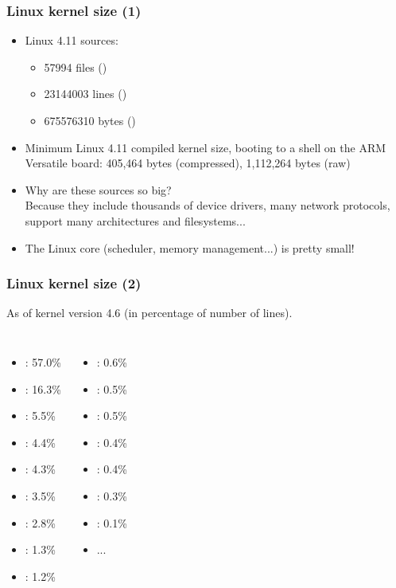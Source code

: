 \begin{frame}
  \frametitle{Linux kernel size (1)}
  \begin{itemize}
  \item Linux 4.11 sources:\\
    \begin{itemize}
	\item 57994 files ()
	\item 23144003 lines ()
	\item 675576310 bytes ()
    \end{itemize}
  \item Minimum Linux 4.11 compiled kernel size,
        booting to a shell on the ARM Versatile board:
    	405,464 bytes (compressed), 1,112,264 bytes (raw)
  \item Why are these sources so big?\\
    Because they include thousands of device drivers, many network
    protocols, support many architectures and filesystems...
  \item The Linux core (scheduler, memory management...) is pretty
    small!
  \end{itemize}
\end{frame}

\begin{frame}
  \frametitle{Linux kernel size (2)}
  As of kernel version 4.6 (in percentage of number of lines).
  \begin{columns}
    \begin{itemize}
    \item {}: 57.0\%
    \item {}: 16.3\%
    \item {}: 5.5\%
    \item {}: 4.4\%
    \item {}: 4.3\%
    \item {}: 3.5\%
    \item {}: 2.8\%
    \item {}: 1.3\%
    \item {}: 1.2\%
    \end{itemize}
    \begin{itemize}
    \item {}: 0.6\%
    \item {}: 0.5\%
    \item {}: 0.5\%
    \item {}: 0.4\%
    \item {}: 0.4\%
    \item {}: 0.3\%
    \item {}: 0.1\%
    \item ...
    \end{itemize}
  \end{columns}
\end{frame}
